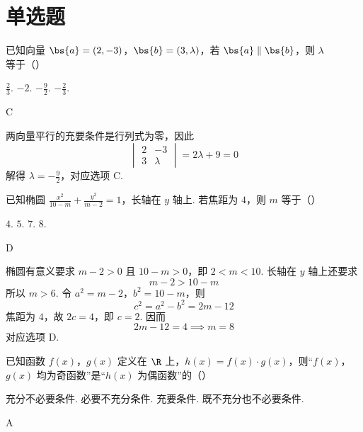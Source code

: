 \section{单选题}

\begin{problem}
已知向量 \(\bs{a}=(2,-3)\)，\(\bs{b}=(3,\lambda)\)，若 \(\bs{a}\parallel\bs{b}\)，则 \(\lambda\) 等于（\quad）

\choices
    {\(\frac{2}{3}\).}
    {\(-2\).}
    {\(-\frac{9}{2}\).}
    {\(-\frac{2}{3}\).}
\end{problem}

\begin{answer}
C
\end{answer}

\begin{solution}
两向量平行的充要条件是行列式为零，因此
\[
\begin{vmatrix}2&-3\\3&\lambda\end{vmatrix}=2\lambda+9=0
\]
解得 \(\lambda=-\frac92\)，对应选项 C.
\end{solution}

\begin{problem}
已知椭圆 \(\frac{x^2}{10-m}+\frac{y^2}{m-2}=1\)，长轴在 \(y\) 轴上. 若焦距为 \(4\)，则 \(m\) 等于（\quad）

\choices
    {\(4\).}
    {\(5\).}
    {\(7\).}
    {\(8\).}
\end{problem}

\begin{answer}
D
\end{answer}

\begin{solution}
椭圆有意义要求 \(m-2>0\) 且 \(10-m>0\)，即 \(2<m<10\). 长轴在 \(y\) 轴上还要求
\[
m-2>10-m
\]
所以 \(m>6\). 令 \(a^2=m-2\)，\(b^2=10-m\)，则
\[
c^2=a^2-b^2=2m-12
\]
焦距为 \(4\)，故 \(2c=4\)，即 \(c=2\). 因而
\[
2m-12=4\implies m=8
\]
对应选项 D.
\end{solution}

\begin{problem}
已知函数 \(f(x)\)，\(g(x)\) 定义在 \(\R\) 上，\(h(x)=f(x)\cdot g(x)\)，则“\(f(x)\)，\(g(x)\) 均为奇函数”是“\(h(x)\) 为偶函数”的（\quad）

\choices
    {充分不必要条件.}
    {必要不充分条件.}
    {充要条件.}
    {既不充分也不必要条件.}
\end{problem}

\begin{answer}
A
\end{answer}


